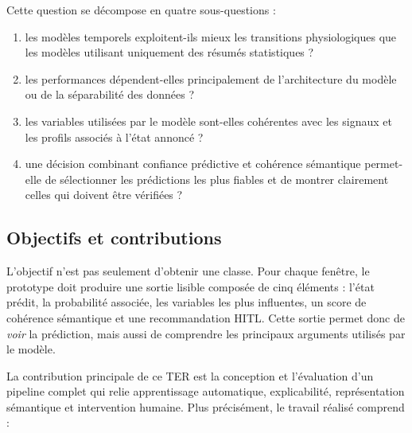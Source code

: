 \documentclass[12pt,a4paper]{article}
\begin{document}
Cette question se décompose en quatre sous-questions :

\begin{enumerate}[leftmargin=1.8em]
  \item les modèles temporels exploitent-ils mieux les transitions
  physiologiques que les modèles utilisant uniquement des résumés
  statistiques ?
  \item les performances dépendent-elles principalement de l'architecture du
  modèle ou de la séparabilité des données ?
  \item les variables utilisées par le modèle sont-elles cohérentes avec les
  signaux et les profils associés à l'état annoncé ?
  \item une décision combinant confiance prédictive et cohérence sémantique
  permet-elle de sélectionner les prédictions les plus fiables et de montrer
  clairement celles qui doivent être vérifiées ?
\end{enumerate}

\subsection{Objectifs et contributions}

L'objectif n'est pas seulement d'obtenir une classe. Pour chaque fenêtre, le
prototype doit produire une sortie lisible composée de cinq éléments :
l'état prédit, la probabilité associée, les variables les plus influentes, un
score de cohérence sémantique et une recommandation HITL. Cette sortie permet
donc de \emph{voir} la prédiction, mais aussi de comprendre les principaux
arguments utilisés par le modèle.

La contribution principale de ce TER est la conception et l'évaluation d'un
pipeline complet qui relie apprentissage automatique, explicabilité,
représentation sémantique et intervention humaine. Plus précisément, le
travail réalisé comprend :
\end{document}
